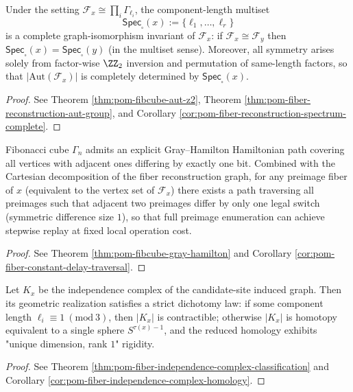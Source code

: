 \begin{conclusion}\label{con:xi-terminal-fiber-geometry-complete-spectrum}
Under the setting \(\mathcal F_x\cong\prod_i \Gamma_{\ell_i}\), the component-length multiset
\[
\mathsf{Spec}_{\square}(x):=\{\ell_1,\dots,\ell_r\}
\]
is a complete graph-isomorphism invariant of \(\mathcal F_x\): if \(\mathcal F_x\cong \mathcal F_y\) then \(\mathsf{Spec}_{\square}(x)=\mathsf{Spec}_{\square}(y)\) (in the multiset sense).
Moreover, all symmetry arises solely from factor-wise \(\ZZ_2\) inversion and permutation of same-length factors, so that \(|\mathrm{Aut}(\mathcal F_x)|\) is completely determined by \(\mathsf{Spec}_{\square}(x)\).
\end{conclusion}
\begin{proof}[Proof]
See Theorem \ref{thm:pom-fibcube-aut-z2}, Theorem \ref{thm:pom-fiber-reconstruction-aut-group}, and Corollary \ref{cor:pom-fiber-reconstruction-spectrum-complete}.
\end{proof}

\begin{conclusion}\label{con:xi-terminal-gray-hamilton-fiberization}
Fibonacci cube \(\Gamma_n\) admits an explicit Gray--Hamilton Hamiltonian path covering all vertices with adjacent ones differing by exactly one bit.
Combined with the Cartesian decomposition of the fiber reconstruction graph, for any preimage fiber of \(x\) (equivalent to the vertex set of \(\mathcal F_x\)) there exists a path traversing all preimages such that adjacent two preimages differ by only one legal switch (symmetric difference size \(1\)), so that full preimage enumeration can achieve stepwise replay at fixed local operation cost.
\end{conclusion}
\begin{proof}[Proof]
See Theorem \ref{thm:pom-fibcube-gray-hamilton} and Corollary \ref{cor:pom-fiber-constant-delay-traversal}.
\end{proof}

\begin{conclusion}\label{con:xi-terminal-fiber-indcomplex-homotopy-dichotomy}
Let \(K_x\) be the independence complex of the candidate-site induced graph.
Then its geometric realization satisfies a strict dichotomy law: if some component length \(\ell_i\equiv 1\ (\mathrm{mod}\ 3)\), then \(|K_x|\) is contractible; otherwise \(|K_x|\) is homotopy equivalent to a single sphere \(S^{\tau(x)-1}\), and the reduced homology exhibits "unique dimension, rank \(1\)" rigidity.
\end{conclusion}
\begin{proof}[Proof]
See Theorem \ref{thm:pom-fiber-independence-complex-classification} and Corollary \ref{cor:pom-fiber-independence-complex-homology}.
\end{proof}

